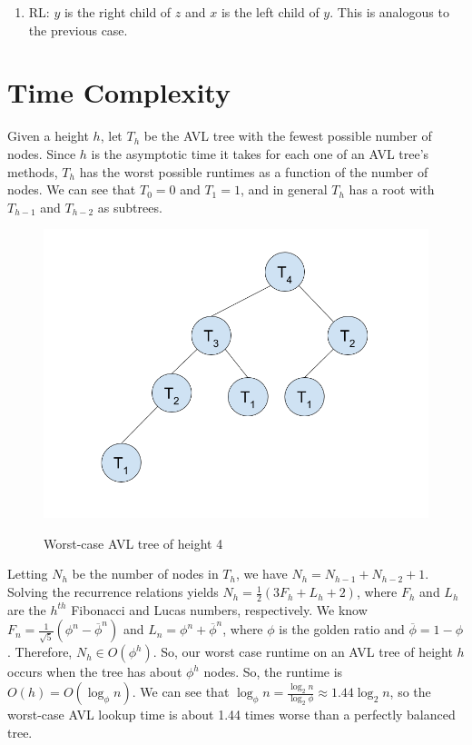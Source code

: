 \documentclass[12pt]{article}
\begin{document}
\begin{enumerate}
  \item RL: $y$ is the right child of $z$ and $x$ is the left child of $y$. This is analogous to the previous case.

\end{enumerate}

\section*{Time Complexity}
Given a height $h$, let $T_h$ be the AVL tree with the fewest possible number of nodes. Since $h$ is the asymptotic time it takes for each one of an AVL tree's methods, $T_h$ has the worst possible runtimes as a function of the number of nodes. We can see that $T_0 = 0$ and $T_1 = 1$, and in general $T_h$ has a root with $T_{h-1}$ and $T_{h-2}$ as subtrees.
\begin{figure}[h]
  \centering
  \includegraphics[scale=0.5]{pics/avl_time} \\
  \caption{Worst-case AVL tree of height 4}
\end{figure}

Letting $N_h$ be the number of nodes in $T_h$, we have $N_h = N_{h-1} + N_{h-2} + 1$. Solving the recurrence relations yields $N_h = \frac{1}{2}\left(3F_h + L_h + 2\right)$, where $F_h$ and $L_h$ are the $h^{th}$ Fibonacci and Lucas numbers, respectively. We know $F_n = \frac{1}{\sqrt{5}}\left( \phi^n - \overline{\phi}^n \right)$ and $L_n = \phi^n + \overline{\phi}^n $, where $\phi$ is the golden ratio and $\overline{\phi} = 1 - \phi$. Therefore, $N_h \in O(\phi^h)$. So, our worst case runtime on an AVL tree of height $h$ occurs when the tree has about $\phi^h$ nodes. So, the runtime is $O(h) = O(\log_{\phi}n)$.
We can see that $\log_{\phi}n = \frac{\log_2 n}{\log_2 \phi} \approx 1.44 \log_2 n$, so the worst-case AVL lookup time is about 1.44 times worse than a perfectly balanced tree.
\end{document}
